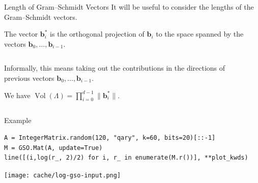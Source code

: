 \documentclass[table,10pt,aspectratio=169]{beamer}
\DeclareMathOperator{\Vol}{Vol}
\renewcommand{\vec}[1]{\ensuremath{\mathbf{#1}}\xspace}
\begin{document}
\begin{frame}[label={sec:org09cd63f}]{Length of Gram--Schmidt Vectors}
It will be useful to consider the lengths of the Gram--Schmidt vectors.

The vector \(\vec{b}^*_i\) is the orthogonal projection of \(\vec{b}_i\) to the space spanned by the vectors \(\vec{b}_0, \ldots, \vec{b}_{i-1}\).

\begin{columns}
\begin{column}{0.45\columnwidth}
\vspace{1em}

Informally, this means taking out the contributions in the directions of previous vectors  \(\vec{b}_0, \ldots, \vec{b}_{i-1}\).

\vspace{1em}

We have \(\Vol(\Lambda) = \prod_{i=0}^{d-1} \|\vec{b}_{i}^{*}\|\).
\end{column}

\begin{column}{0.45\columnwidth}
\end{column}
\end{columns}
\end{frame}

\begin{frame}[label={sec:org4d31714},fragile]{Example}
 \lstset{language=Python,label= ,caption= ,captionpos=b,numbers=none}
\begin{lstlisting}
A = IntegerMatrix.random(120, "qary", k=60, bits=20)[::-1]
M = GSO.Mat(A, update=True)
line([(i,log(r_, 2)/2) for i, r_ in enumerate(M.r())], **plot_kwds)
\end{lstlisting}

\begin{center}
\texttt{[image: cache/log-gso-input.png]}
\end{center}
\end{frame}
\end{document}

